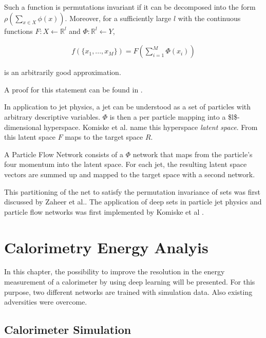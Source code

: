 \documentclass[12pt, a4paper]{thesis}
\begin{document}
Such a function is permutations invariant if it can be decomposed into
the form \(\rho\left( \sum_{x\in X} \phi(x) \right)\). Moreover, for a
sufficiently large \(l\) with the continuous functions \(F: X \leftarrow \mathbb{R}^l\) and \(\Phi: \mathbb{R}^l
\leftarrow Y\), 

\begin{align}
f(\{x_1, ... , x_M \}) = F(\sum_{i=1}^M \Phi(x_i))
\end{align}

is an arbitrarily good approximation.

A proof for this statement can be found in \cite{zaheer17_deep_sets}.

In application to jet physics, a jet can be understood as a set of
particles with arbitrary descriptive variables. \(\Phi\) is then a per
particle mapping into a \$l\$-dimensional hyperspace.  Komiske et
al. name this hyperspace \emph{latent space}. From this latent space \(F\) maps
to the target space \(R\).

A Particle Flow Network \cite{komiske19_energ_flow_networ} consists of a \(\Phi\) network that maps from
the particle's four momentum into the latent space. For each jet, the
resulting latent space vectors are summed up and mapped to the target
space with a second network.

This partitioning of the net to satisfy the permutation invariance of
sets was first discussed by Zaheer et al.\cite{zaheer17_deep_sets}. The
application of deep sets in particle jet physics and particle flow
networks was first implemented by Komiske et al \cite{komiske19_energ_flow_networ}.

\chapter{Calorimetry Energy Analyis}
\label{sec:orgb9c4fb7}

In this chapter, the possibility to improve the resolution in the energy
measurement of a calorimeter by using deep learning will be presented. For this
purpose, two different networks are trained with simulation data. Also existing
adversities were overcome.

\section{Calorimeter Simulation}
\label{sec:org905cdeb}
\end{document}
